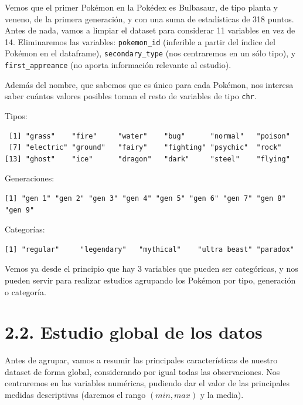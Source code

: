\documentclass[
  12pt,
]{extreport}
\begin{document}
Vemos que el primer Pokémon en la Pokédex es Bulbasaur, de tipo planta y
veneno, de la primera generación, y con una suma de estadísticas de 318
puntos. Antes de nada, vamos a limpiar el dataset para considerar 11
variables en vez de 14. Eliminaremos las variables: \texttt{pokemon\_id}
(inferible a partir del índice del Pokémon en el dataframe),
\texttt{secondary\_type} (nos centraremos en un sólo tipo), y
\texttt{first\_appreance} (no aporta información relevante al estudio).

Además del nombre, que sabemos que es único para cada Pokémon, nos
interesa saber cuántos valores posibles toman el resto de variables de
tipo \texttt{chr}.

Tipos:

\begin{verbatim}
 [1] "grass"    "fire"     "water"    "bug"      "normal"   "poison"  
 [7] "electric" "ground"   "fairy"    "fighting" "psychic"  "rock"    
[13] "ghost"    "ice"      "dragon"   "dark"     "steel"    "flying"  
\end{verbatim}

Generaciones:

\begin{verbatim}
[1] "gen 1" "gen 2" "gen 3" "gen 4" "gen 5" "gen 6" "gen 7" "gen 8" "gen 9"
\end{verbatim}

Categorías:

\begin{verbatim}
[1] "regular"     "legendary"   "mythical"    "ultra beast" "paradox"    
\end{verbatim}

Vemos ya desde el principio que hay 3 variables que pueden ser
categóricas, y nos pueden servir para realizar estudios agrupando los
Pokémon por tipo, generación o categoría.

\section{2.2. Estudio global de los
datos}\label{estudio-global-de-los-datos}

Antes de agrupar, vamos a resumir las principales características de
nuestro dataset de forma global, considerando por igual todas las
observaciones. Nos centraremos en las variables numéricas, pudiendo dar
el valor de las principales medidas descriptivas (daremos el rango
\((min, max)\) y la media).
\end{document}
